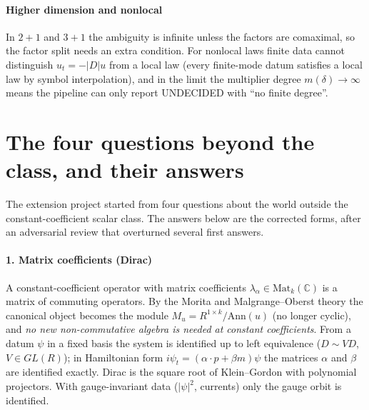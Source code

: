\documentclass[11pt]{article}
\theoremstyle{plain}
\theoremstyle{definition}
\theoremstyle{remark}
\newcommand{\C}{\mathbb{C}}
\newcommand{\lab}[1]{\textsf{#1}}           %
\newcommand{\UND}{\lab{UNDECIDED}}
\begin{document}
\paragraph{Higher dimension and nonlocal} In $2{+}1$ and $3{+}1$ the ambiguity is infinite unless the factors are comaximal, so the factor split needs an extra condition. For nonlocal laws finite data cannot distinguish $u_t=-\lvert D\rvert u$ from a local law (every finite-mode datum satisfies a local law by symbol interpolation), and in the limit
the multiplier degree $m(\delta)\to\infty$ means the pipeline can only report \UND{} with ``no finite degree''.


\section{The four questions beyond the class, and their answers}\label{sec:questions}
The extension project started from four questions about the world outside the constant-coefficient scalar class. The answers below are the corrected forms, after an adversarial review that overturned several first answers.

\paragraph{1. Matrix coefficients (Dirac)} A constant-coefficient operator with matrix coefficients $\lambda_\alpha\in\mathrm{Mat}_k(\C)$ is a matrix of commuting operators. By the Morita and Malgrange--Oberst theory the canonical object becomes the module $M_u=R^{1\times k}/\mathrm{Ann}(u)$ (no longer cyclic), and \emph{no new non-commutative algebra is needed at constant coefficients}.
From a datum $\psi$ in a fixed basis the system is identified up to left equivalence ($D\sim VD$, $V\in GL(R)$); in Hamiltonian form $i\psi_t=(\alpha\cdot p+\beta m)\psi$ the matrices $\alpha$ and $\beta$ are identified exactly. Dirac is the square root of Klein--Gordon with polynomial projectors. With gauge-invariant data ($\lvert\psi\rvert^2$, currents) only the gauge orbit is identified.
\end{document}
